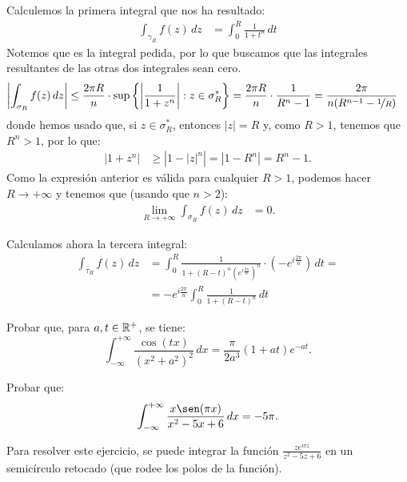 \begin{ejercicio}
    Calculemos la primera integral que nos ha resultado:
    \begin{align*}
        \int_{\gamma_R} f(z) \, dz &= \int_{0}^{R} \frac{1}{1 + t^n} \, dt
    \end{align*}
    Notemos que es la integral pedida, por lo que buscamos que las integrales resultantes de las otras dos integrales sean cero.
    \begin{align*}
        \left| \int_{\sigma_R} f(z) \, dz \right|
        &\leq \frac{2\pi R}{n}\cdot \sup\left\{\left|\dfrac{1}{1 + z^n}\right| : z\in \sigma_R^*\right\}
        = \frac{2\pi R}{n}\cdot \frac{1}{R^n - 1}
        = \frac{2\pi}{n(R^{n-1} - \nicefrac{1}{R})}
    \end{align*}
    donde hemos usado que, si $z\in \sigma_R^*$, entonces $|z|=R$ y, como $R>1$, tenemos que $R^n>1$, por lo que:
    \begin{align*}
        |1 + z^n| &\geq \left|1- |z|^n\right| = \left|1 - R^n\right| = R^n - 1.
    \end{align*}
    Como la expresión anterior es válida para cualquier $R > 1$, podemos hacer $R \to +\infty$ y tenemos que (usando que $n > 2$):
    \begin{align*}
        \lim_{R\to+\infty} \int_{\sigma_R} f(z) \, dz &= 0.
    \end{align*}

    Calculamos ahora la tercera integral:
    \begin{align*}
        \int_{\tau_R} f(z) \, dz &= \int_{0}^{R} \frac{1}{1 + (R-t)^n \left(e^{i\frac{2\pi}{n}}\right)^n} \cdot \left(-e^{i\frac{2\pi}{n}}\right) \, dt
        =\\&= -e^{i\frac{2\pi}{n}}\int_{0}^{R} \frac{1}{1 + (R-t)^n} \, dt
    \end{align*}

\end{ejercicio}

\begin{ejercicio}
    Probar que, para $a, t \in \mathbb{R}^+$, se tiene:
    \begin{equation*}
        \int_{-\infty}^{+\infty} \frac{\cos(tx)}{(x^2 + a^2)^2} \, dx = \frac{\pi}{2a^3}(1 + a t)e^{-a t}.
    \end{equation*}
\end{ejercicio}

\begin{ejercicio}
    Probar que:
    \begin{equation*}
        \int_{-\infty}^{+\infty} \frac{x\sen(\pi x)}{x^2-5x+6} \, dx = -5\pi.
    \end{equation*}
    \begin{observacion}
        Para resolver este ejercicio, se puede integrar la función $\frac{ze^{i\pi z}}{z^2-5z+6}$ en un semicírculo retocado (que rodee los polos de la función).
    \end{observacion}
\end{ejercicio}

